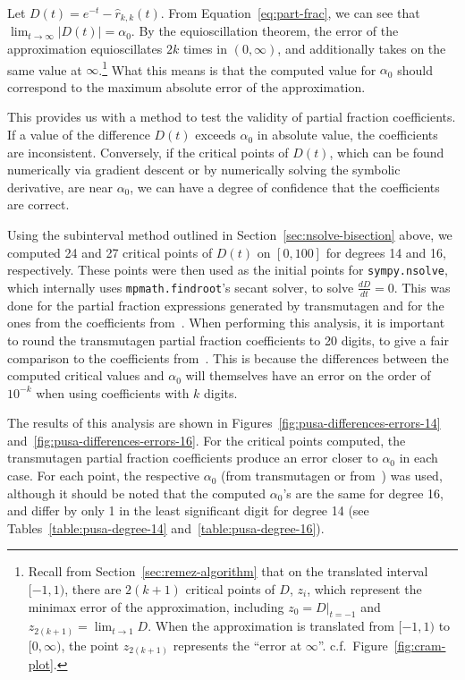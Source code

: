 Let $D(t) = e^{-t} - \hat{r}_{k,k}(t)$. From Equation~\ref{eq:part-frac}, we can see that
$\lim_{t\to\infty}{\left|D(t) \right|} = \alpha_0$. By the
equioscillation theorem, the error of the approximation equioscillates $2k$
times in $(0, \infty)$, and additionally takes on the same value at
$\infty$.\footnote{Recall from Section~\ref{sec:remez-algorithm} that on the
  translated interval $[-1, 1)$, there are $2(k+1)$ critical points of $D$,
  $z_i$, which represent the minimax error of the approximation, including
  $z_0 = D|_{t=-1}$ and $z_{2(k+1)}=\lim_{t\to 1}{D}$. When the approximation
  is translated from $[-1, 1)$ to $[0, \infty)$, the point $z_{2(k + 1)}$
  represents the ``error at $\infty$''. c.f.\ Figure~\ref{fig:cram-plot}.}
What this means is that the computed value for $\alpha_0$ should correspond to
the maximum absolute error of the approximation.

This provides us with a method to test the validity of partial fraction
coefficients. If a value of the difference $D(t)$ exceeds $\alpha_0$ in
absolute value, the coefficients are inconsistent. Conversely, if the critical
points of $D(t)$, which can be found numerically via gradient descent or by
numerically solving the symbolic derivative, are near $\alpha_0$, we can have
a degree of confidence that the coefficients are correct.

Using the subinterval method outlined in Section~\ref{sec:nsolve-bisection}
above, we computed 24 and 27 critical points of $D(t)$ on $[0, 100]$ for
degrees 14 and 16, respectively. These points were then used as the initial
points for \texttt{sympy.\allowbreak{}nsolve}, which internally uses
\texttt{mpmath.findroot}'s secant solver, to solve $\frac{dD}{dt}=0$. This was
done for the partial fraction expressions generated by transmutagen and for
the ones from the coefficients from~\cite{pusa2012correction}. When performing
this analysis, it is important to round the transmutagen partial fraction
coefficients to 20 digits, to give a fair comparison to the coefficients
from~\cite{pusa2012correction}. This is because the differences between the
computed critical values and $\alpha_0$ will themselves have an error on the
order of $10^{-k}$ when using coefficients with $k$ digits.

The results of this analysis are shown in
Figures~\ref{fig:pusa-differences-errors-14}
and~\ref{fig:pusa-differences-errors-16}. For the critical points computed,
the transmutagen partial fraction coefficients produce an error closer to
$\alpha_0$ in each case. For each point, the respective $\alpha_0$ (from
transmutagen or from~\cite{pusa2012correction}) was used, although it should
be noted that the computed $\alpha_0$'s are the same for degree 16, and differ
by only 1 in the least significant digit for degree 14 (see
Tables~\ref{table:pusa-degree-14} and~\ref{table:pusa-degree-16}).

